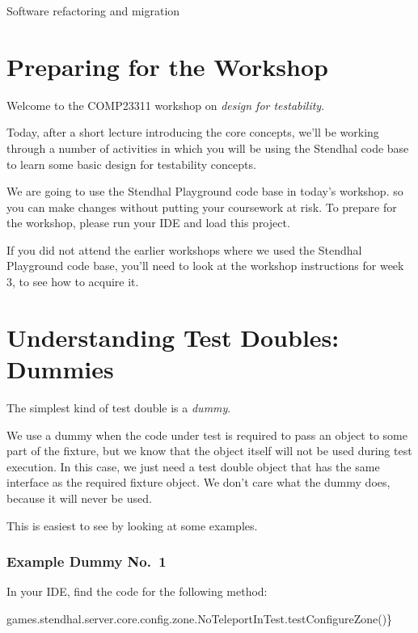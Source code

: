 \documentclass[
]{book}
\newenvironment{Shaded}{\begin{snugshade}}{\end{snugshade}}
\newcommand{\FunctionTok}[1]{\textcolor[rgb]{0.00,0.00,0.00}{#1}}
\newcommand{\NormalTok}[1]{#1}
\begin{document}
Software refactoring and migration

\hypertarget{preparing-for-the-workshop-1}{%
\section{Preparing for the Workshop}\label{preparing-for-the-workshop-1}}

Welcome to the COMP23311 workshop on \emph{design for testability}.

Today, after a short lecture introducing the core concepts, we'll be working through a number of activities in which you will be using the Stendhal code base to learn some basic design for testability concepts.

We are going to use the Stendhal Playground code base in today's workshop. so you can make changes without putting your coursework at risk. To prepare for the workshop, please run your IDE and load this project.

If you did not attend the earlier workshops where we used the Stendhal Playground code base, you'll need to look at the workshop instructions for week 3, to see how to acquire it.

\hypertarget{dummies}{%
\section{Understanding Test Doubles: Dummies}\label{dummies}}

The simplest kind of test double is a \emph{dummy}.

We use a dummy when the code under test is required to pass an object to some part of the fixture, but we know that the object itself will not be used during test execution. In this case, we just need a test double object that has the same interface as the required fixture object. We don't care what the dummy does, because it will never be used.

This is easiest to see by looking at some examples.

\hypertarget{dummy1}{%
\subsubsection{Example Dummy No.~1}\label{dummy1}}

In your IDE, find the code for the following method:

\begin{Shaded}
\begin{Highlighting}[]
\NormalTok{games.}\FunctionTok{stendhal}\NormalTok{.}\FunctionTok{server}\NormalTok{.}\FunctionTok{core}\NormalTok{.}\FunctionTok{config}\NormalTok{.}\FunctionTok{zone}\NormalTok{.}\FunctionTok{NoTeleportInTest}\NormalTok{.}\FunctionTok{testConfigureZone}\NormalTok{()\}}
\end{Highlighting}
\end{Shaded}
\end{document}

